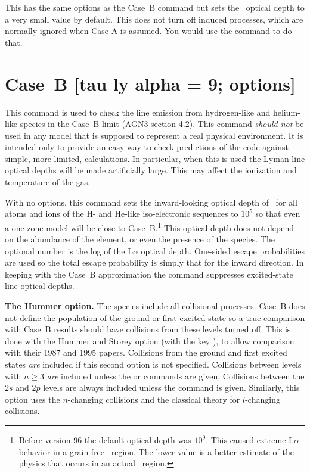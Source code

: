 This has the same options as the Case~B command but sets the \la\ optical
depth to a very small value by default.
This does not turn off induced
processes, which are normally ignored when Case A is assumed.
You would
use the  command to do that.

\section{Case~B [tau ly alpha = 9; options]}
\label{sec:CaseBCommand}

This command is used to check the line emission from  hydrogen-like and
helium-like species in the Case~B limit (AGN3 section 4.2).
This command \emph{should
not} be used in any model that is supposed to represent a real physical
environment.
It is intended only to provide an easy way to check predictions
of the code against simple, more limited, calculations.
In particular,
when this is used the Lyman-line optical depths will be made artificially
large.
This may affect the ionization and temperature of the gas.

With no options, this command sets the inward-looking optical depth of
\la\ for all
atoms and ions of the H- and He-like iso-electronic sequences to
$10^5$ so
that even a one-zone model will be close to
Case~B.\footnote{Before version
96 the default optical depth was $10^9$.  This caused
extreme L$\alpha $ behavior in a grain-free \hii\ region.  The lower value is a better
estimate of the physics that occurs in an actual \hii\ region.}
This optical depth does not depend on the abundance of the element, or even
the presence of the species.
The optional number
is the log of the L$\alpha $ optical depth.
One-sided escape probabilities are
used so the total escape probability is simply that for the inward direction.
In keeping with the Case~B approximation the  command suppresses
excited-state line optical depths.

{\bf The Hummer option.}
The species include all collisional processes.
Case~B does not define
the population of the ground or first excited state so a true comparison
with Case~B results should have collisions from these levels turned off.
This is done with the Hummer and Storey option (with the key ), to allow
comparison with their 1987 and 1995 papers.
Collisions from the ground
and first excited states \emph{are} included if this second option is not specified.
Collisions between levels with $n\ge  3$ \emph{are} included unless the
or  commands are given.  Collisions
between the $2s$ and $2p$ levels are always included unless the
 command is given.
Similarly, this option uses the \citet{Percival1978} $n$-changing collisions and the
classical \citet{PengellySeaton1964} theory for $l$-changing collisions.


